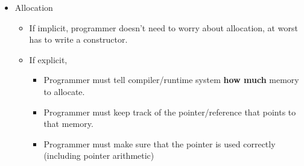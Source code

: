 \begin{itemize}
\item Allocation
  \begin{itemize}[noitemsep]
  \item If implicit, programmer doesn't need to worry about allocation, at worst has to write a constructor.
  \item If explicit,
    \begin{itemize}[noitemsep]
    \item Programmer must tell compiler/runtime system \textbf{how much} memory to allocate.
    \item Programmer must keep track of the pointer/reference that points to that memory.
    \item Programmer must make sure that the pointer is used correctly (including pointer arithmetic)
    \end{itemize}
  \end{itemize}


\end{itemize}
